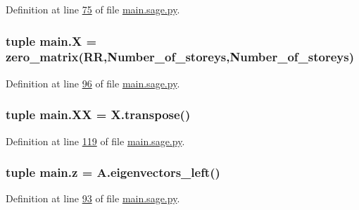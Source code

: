 Definition at line \hyperlink{main_8sage_8py_source_l00075}{75} of file \hyperlink{main_8sage_8py_source}{main.\+sage.\+py}.

\hypertarget{namespacemain_a5eac8e4368036ef94463d6e42c1628c5}{}
\subsubsection[{X}]{\setlength{\rightskip}{0pt plus 5cm}tuple main.\+X = zero\+\_\+matrix(R\+R,Number\+\_\+of\+\_\+storeys,Number\+\_\+of\+\_\+storeys)}\label{namespacemain_a5eac8e4368036ef94463d6e42c1628c5}


Definition at line \hyperlink{main_8sage_8py_source_l00096}{96} of file \hyperlink{main_8sage_8py_source}{main.\+sage.\+py}.

\hypertarget{namespacemain_ae18df6a00aee4516c7ad8961b666e2a3}{}
\subsubsection[{X\+X}]{\setlength{\rightskip}{0pt plus 5cm}tuple main.\+X\+X = X.\+transpose()}\label{namespacemain_ae18df6a00aee4516c7ad8961b666e2a3}


Definition at line \hyperlink{main_8sage_8py_source_l00119}{119} of file \hyperlink{main_8sage_8py_source}{main.\+sage.\+py}.

\hypertarget{namespacemain_a2d5b336e3b2f7d2e14f04fa3cc413457}{}
\subsubsection[{z}]{\setlength{\rightskip}{0pt plus 5cm}tuple main.\+z = A.\+eigenvectors\+\_\+left()}\label{namespacemain_a2d5b336e3b2f7d2e14f04fa3cc413457}


Definition at line \hyperlink{main_8sage_8py_source_l00093}{93} of file \hyperlink{main_8sage_8py_source}{main.\+sage.\+py}.

